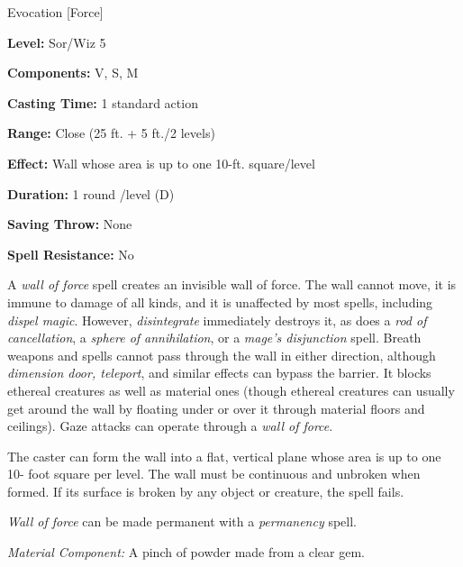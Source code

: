 
Evocation [Force]

\textbf{Level:} Sor/Wiz 5

\textbf{Components:} V, S, M

\textbf{Casting Time:} 1 standard action

\textbf{Range:} Close (25 ft. + 5 ft./2 levels)

\textbf{Effect:} Wall whose area is up to one 10-ft. square/level

\textbf{Duration:} 1 round /level (D)

\textbf{Saving Throw:} None

\textbf{Spell Resistance:} No

A \textit{wall of force} spell creates an invisible wall of force. The wall cannot 
move, it is immune to damage of all kinds, and it is unaffected by most spells, 
including \textit{dispel magic}. However, \textit{disintegrate} immediately destroys 
it, as does a \textit{rod of cancellation}, a \textit{sphere of annihilation}, or 
a \textit{mage's disjunction} spell. Breath weapons and spells cannot pass through 
the wall in either direction, although \textit{dimension door, teleport}, and similar 
effects can bypass the barrier. It blocks ethereal creatures as well as material 
ones (though ethereal creatures can usually get around the wall by floating under 
or over it through material floors and ceilings). Gaze attacks can operate through 
a \textit{wall of force}.

The caster can form the wall into a flat, vertical plane whose area is up to one 
10- foot square per level. The wall must be continuous and unbroken when formed. 
If its surface is broken by any object or creature, the spell fails.

\textit{Wall of force} can be made permanent with a \textit{permanency} spell.

\textit{Material Component:} A pinch of powder made from a clear gem.

